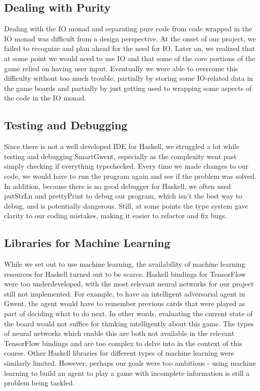 \documentclass[numbers]{sigplanconf}
\begin{document}
\subsection{Dealing with Purity}
Dealing with the IO monad and separating pure code from code wrapped in the IO monad was difficult from a design perspective. At the onset of our project, we failed to recognize and plan ahead for the need for IO. Later on, we realized that at some point we would need to use IO and that some of the core portions of the game relied on having user input. Eventually we were able to overcome this difficulty without too much trouble, partially by storing some IO-related data in the game boards and partially by just getting used to wrapping some aspects of the code in the IO monad. 

\subsection{Testing and Debugging }
Since there is not a well developed IDE for Haskell, we struggled a lot while testing and debugging SmartGwent, especially as the complexity went past simply checking if everything typechecked. Every time we made changes to our code, we would have to run the program again and see if the problem was solved. In addition, because there is no good debugger for Haskell, we often used putStrLn and prettyPrint to debug our program, which isn't the best way to debug, and is potentially dangerous. Still, at some points the type system gave clarity to our coding mistakes, making it easier to refactor and fix bugs.

\subsection{Libraries for Machine Learning}
While we set out to use machine learning, the availability of machine learning resources for Haskell turned out to be scarce. Haskell bindings for TensorFlow were too underdeveloped, with the most relevant neural networks for our project still not implemented. For example, to have an intelligent adversarial agent in Gwent, the agent would have to remember previous cards that were played as part of deciding what to do next. In other words, evaluating the current state of the board would not suffice for thinking intelligently about this game. The types of neural networks which enable this are both not available in the relevant TensorFlow bindings and are too complex to delve into in the context of this course. Other Haskell libraries for different types of machine learning were similarly limited. However, perhaps our goals were too ambitious - using machine learning to build an agent to play a game with incomplete information is still a problem being tackled.
\end{document}
